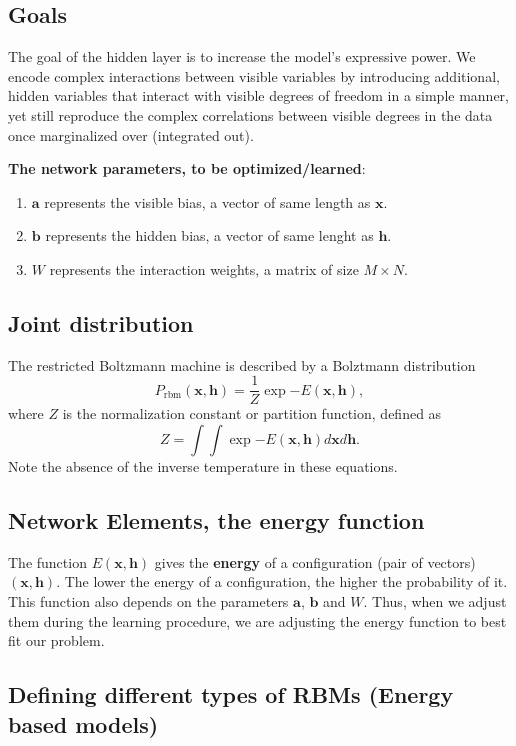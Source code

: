 \documentclass[%
oneside,                 %
final,                   %
10pt]{article}
\begin{document}
\noindent
\subsection{Goals}

The goal of the hidden layer is to increase the model's expressive
power. We encode complex interactions between visible variables by
introducing additional, hidden variables that interact with visible
degrees of freedom in a simple manner, yet still reproduce the complex
correlations between visible degrees in the data once marginalized
over (integrated out).

\textbf{The network parameters, to be optimized/learned}:
\begin{enumerate}
 \item $\bm{a}$ represents the visible bias, a vector of same length as $\bm{x}$.

 \item $\bm{b}$ represents the hidden bias, a vector of same lenght as $\bm{h}$.

 \item $W$ represents the interaction weights, a matrix of size $M\times N$.
\end{enumerate}

\noindent
\subsection{Joint distribution}
The restricted Boltzmann machine is described by a Bolztmann distribution
\[
	P_{\mathrm{rbm}}(\bm{x},\bm{h}) = \frac{1}{Z} \exp{-E(\bm{x},\bm{h})},
\]
where $Z$ is the normalization constant or partition function, defined as 
\[
	Z = \int \int \exp{-E(\bm{x},\bm{h})} d\bm{x} d\bm{h}.
\]
Note the absence of the inverse temperature in these equations.

\subsection{Network Elements, the energy function}

The function $E(\bm{x},\bm{h})$ gives the \textbf{energy} of a
configuration (pair of vectors) $(\bm{x}, \bm{h})$. The lower
the energy of a configuration, the higher the probability of it. This
function also depends on the parameters $\bm{a}$, $\bm{b}$ and
$W$. Thus, when we adjust them during the learning procedure, we are
adjusting the energy function to best fit our problem.

\subsection{Defining different types of RBMs (Energy based models)}
\end{document}
